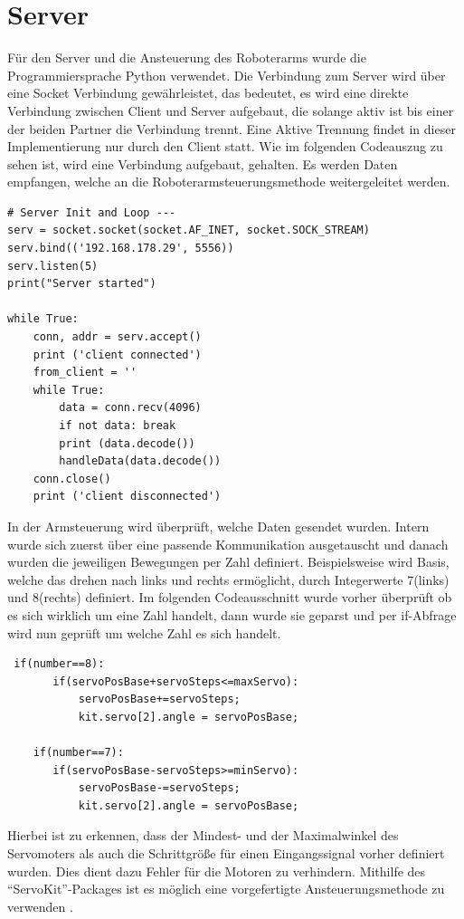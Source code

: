 \documentclass[12pt,					%
							 oneside,			%
							 a4paper,			%
							 halfparskip,		%
							 liststotoc,			%
							 bibtotoc,			%
							 fleqn,				%
							 pointlessnumbers]	%
							 {scrreprt}
\begin{document}
\section{Server}
Für den Server und die Ansteuerung des Roboterarms wurde die Programmiersprache Python verwendet.\cite{PiHandbuch} Die Verbindung zum Server wird über eine Socket Verbindung gewährleistet, das bedeutet, es wird eine direkte Verbindung zwischen Client und Server aufgebaut, die solange aktiv ist bis einer der beiden Partner die Verbindung trennt. Eine Aktive Trennung findet in dieser Implementierung nur durch den Client statt. Wie im folgenden Codeauszug zu sehen ist, wird eine Verbindung aufgebaut, gehalten. Es werden Daten empfangen, welche an die Roboterarmsteuerungsmethode weitergeleitet werden.
\begin{lstlisting}
# Server Init and Loop ---
serv = socket.socket(socket.AF_INET, socket.SOCK_STREAM)
serv.bind(('192.168.178.29', 5556))
serv.listen(5)
print("Server started")

while True:
    conn, addr = serv.accept()
    print ('client connected')
    from_client = ''
    while True:
        data = conn.recv(4096)
        if not data: break
        print (data.decode())
        handleData(data.decode())
    conn.close()
    print ('client disconnected')
\end{lstlisting}


In der Armsteuerung wird überprüft, welche Daten gesendet wurden. Intern wurde sich zuerst über eine passende Kommunikation ausgetauscht und danach wurden die jeweiligen Bewegungen per Zahl definiert. Beispielsweise wird Basis, welche das drehen nach links und rechts ermöglicht, durch Integerwerte 7(links) und 8(rechts) definiert. Im folgenden Codeausschnitt wurde vorher überprüft ob es sich wirklich um eine Zahl handelt, dann wurde sie geparst und per \glqq{}if\grqq{}-Abfrage wird nun geprüft um welche Zahl es sich handelt. 
\newpage
\begin{lstlisting}
 if(number==8):
       if(servoPosBase+servoSteps<=maxServo):           
           servoPosBase+=servoSteps;
           kit.servo[2].angle = servoPosBase;
        
    if(number==7):
       if(servoPosBase-servoSteps>=minServo):           
           servoPosBase-=servoSteps;
           kit.servo[2].angle = servoPosBase;
\end{lstlisting}
Hierbei ist zu erkennen, dass der Mindest- und der Maximalwinkel des Servomoters als auch die Schrittgröße für einen Eingangssignal vorher definiert wurden. Dies dient dazu Fehler für die Motoren zu verhindern.  Mithilfe des ``ServoKit''-Packages ist es möglich eine vorgefertigte Ansteuerungsmethode zu verwenden \cite{Foundation2020}.
\end{document}
